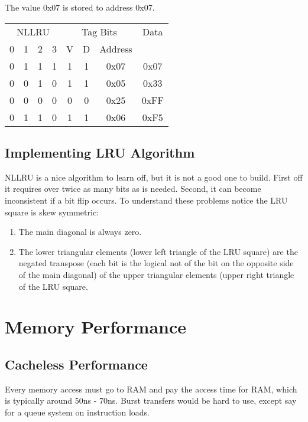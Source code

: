 The value 0x07 is stored to address 0x07.

\vspace{6pt}\noindent
\begin{tabular}{|c|c|c|c|c|c|c|c|}
  \hline
  \multicolumn{4}{|c|}{NLLRU} & \multicolumn{3}{|c|}{Tag Bits} & Data \\
  0 & 1 & 2 & 3 & V & D & Address & \\ \hline
  0 & 1 & 1 & 1 & 1 & 1 & 0x07 & 0x07 \\
  0 & 0 & 1 & 0 & 1 & 1 & 0x05 & 0x33 \\
  0 & 0 & 0 & 0 & 0 & 0 & 0x25 & 0xFF \\
  0 & 1 & 1 & 0 & 1 & 1 & 0x06 & 0xF5 \\
  \hline
\end{tabular}
\vspace{6pt}

\subsection{Implementing LRU Algorithm}

NLLRU is a nice algorithm to learn off, but it is not a good one to build.  First off it requires over twice as many bits as is needed.  Second, it can become inconsistent if a bit flip occurs.  To understand these problems notice the LRU square is skew symmetric:
\begin{enumerate}
\item The main diagonal is always zero.
\item The lower triangular elements (lower left triangle of the LRU square) are the negated transpose (each bit is the logical not of the bit on the opposite side of the main diagonal) of the upper triangular elements (upper right triangle of the LRU square.
\end{enumerate}


\section{Memory Performance}
\subsection{Cacheless Performance}

Every memory access must go to RAM and pay the access time for RAM, which is typically around 50ns - 70ns.  Burst transfers would be hard to use, except say for a queue system on instruction loads.

